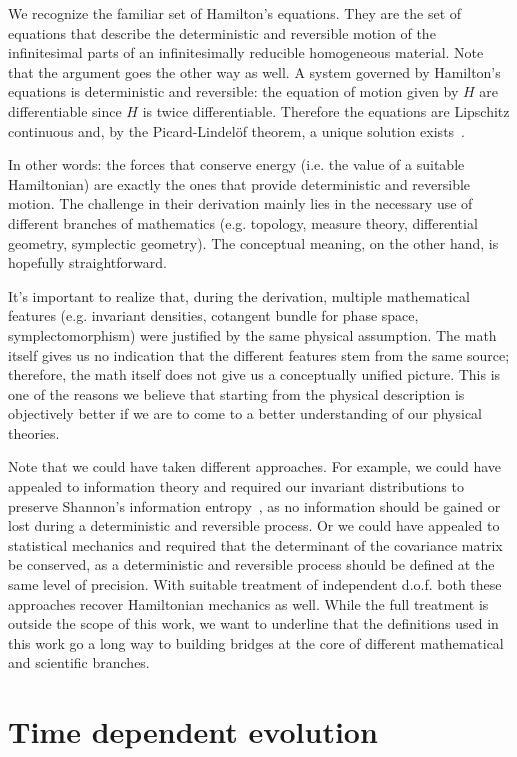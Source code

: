 \documentclass[smallextended]{svjour3}
\numberwithin{equation}{section}
\theoremstyle{definition}
\begin{document}
We recognize the familiar set of Hamilton's equations. They are the set of equations that describe the deterministic and reversible motion of the infinitesimal parts of an infinitesimally reducible homogeneous material. Note that the argument goes the other way as well. A system governed by Hamilton's equations is deterministic and reversible: the equation of motion given by $H$ are differentiable since $H$ is twice differentiable. Therefore the equations are Lipschitz continuous and, by the Picard-Lindel\"{o}f theorem, a unique solution exists~\cite{Grant}.

In other words: the forces that conserve energy (i.e. the value of a suitable Hamiltonian) are exactly the ones that provide deterministic and reversible motion. The challenge in their derivation mainly lies in the necessary use of different branches of mathematics (e.g. topology, measure theory, differential geometry, symplectic geometry). The conceptual meaning, on the other hand, is hopefully straightforward.

It's important to realize that, during the derivation, multiple mathematical features (e.g. invariant densities, cotangent bundle for phase space, symplectomorphism) were justified by the same physical assumption. The math itself gives us no indication that the different features stem from the same source; therefore, the math itself does not give us a conceptually unified picture. This is one of the reasons we believe that starting from the physical description is objectively better if we are to come to a better understanding of our physical theories.

Note that we could have taken different approaches. For example, we could have appealed to information theory and required our invariant distributions to preserve Shannon's information entropy~\cite{Shannon}, as no information should be gained or lost during a deterministic and reversible process. Or we could have appealed to statistical mechanics and required that the determinant of the covariance matrix be conserved, as a deterministic and reversible process should be defined at the same level of precision. With suitable treatment of independent d.o.f. both these approaches recover Hamiltonian mechanics as well. While the full treatment is outside the scope of this work, we want to underline that the definitions used in this work go a long way to building bridges at the core of different mathematical and scientific branches.

\section{Time dependent evolution}
\label{sec:relativity}
\end{document}

